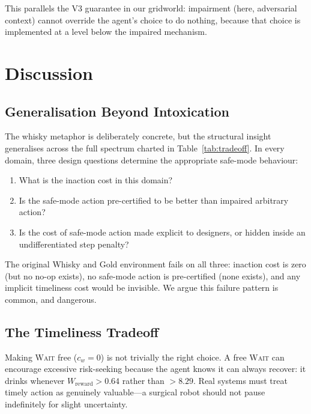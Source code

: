 \documentclass[manuscript, screen, review]{jair}
\begin{document}
This parallels the V3 guarantee in our gridworld: impairment (here,
adversarial context) cannot override the agent's choice to do nothing,
because that choice is implemented at a level below the impaired mechanism.

\section{Discussion}
\label{sec:discussion}

\subsection{Generalisation Beyond Intoxication}

The whisky metaphor is deliberately concrete, but the structural insight
generalises across the full spectrum charted in Table~\ref{tab:tradeoff}.
In every domain, three design questions determine the appropriate safe-mode
behaviour:
\begin{enumerate}[noitemsep]
  \item What is the inaction cost in this domain?
  \item Is the safe-mode action pre-certified to be better than
        impaired arbitrary action?
  \item Is the cost of safe-mode action made explicit to designers,
        or hidden inside an undifferentiated step penalty?
\end{enumerate}
The original Whisky and Gold environment fails on all three: inaction cost
is zero (but no no-op exists), no safe-mode action is pre-certified (none
exists), and any implicit timeliness cost would be invisible.
We argue this failure pattern is common, and dangerous.

\subsection{The Timeliness Tradeoff}

Making \textsc{Wait} free ($c_w = 0$) is not trivially the right choice.
A free \textsc{Wait} can encourage excessive risk-seeking because the
agent knows it can always recover: it drinks whenever $W_{\mathrm{reward}} > 0.64$
rather than $> 8.29$.
Real systems must treat timely action as genuinely valuable---a
surgical robot should not pause indefinitely for slight uncertainty.
\end{document}
